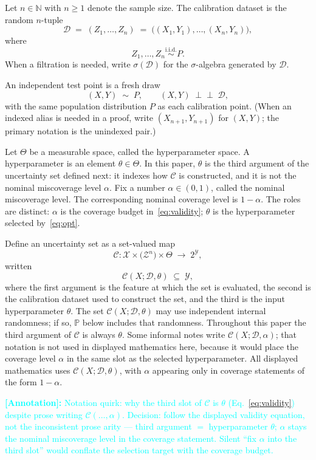 \documentclass[12pt]{article}
\theoremstyle{plain}
\newcommand{\annote}[1]{\textcolor{cyan}{\textbf{[Annotation]:} #1}}
\begin{document}
\label{def:D}
Let $n\in\mathbb{N}$ with $n\ge 1$ denote the sample size.
The calibration dataset is the random $n$-tuple
\[
\mathcal{D}
\;=\;
(Z_1,\dots,Z_n)
\;=\;
\bigl((X_1,Y_1),\dots,(X_n,Y_n)\bigr),
\]
where
\[
Z_1,\dots,Z_n
\overset{\mathrm{i.i.d.}}{\sim}
P.
\]
When a filtration is needed, write $\sigma(\mathcal{D})$ for the $\sigma$-algebra generated by $\mathcal{D}$.

\label{def:test}
An independent test point is a fresh draw
\[
(X,Y)\;\sim\; P,
\qquad
(X,Y)\;\perp\!\!\!\perp\;\mathcal{D},
\]
with the same population distribution $P$ as each calibration point.
(When an indexed alias is needed in a proof, write $(X_{n+1},Y_{n+1})$ for $(X,Y)$; the primary notation is the unindexed pair.)

\label{def:theta}
Let $\Theta$ be a measurable space, called the hyperparameter space.
A hyperparameter is an element $\theta\in\Theta$.
In this paper, $\theta$ is the third argument of the uncertainty set defined next: it indexes how $\mathcal{C}$ is constructed, and it is not the nominal miscoverage level $\alpha$.
\label{def:alpha}
Fix a number $\alpha\in(0,1)$, called the nominal miscoverage level.
The corresponding nominal coverage level is $1-\alpha$.
The roles are distinct: $\alpha$ is the coverage budget in~\eqref{eq:validity}; $\theta$ is the hyperparameter selected by~\eqref{eq:opt}.

\label{def:C}
Define an uncertainty set as a set-valued map
\[
\mathcal{C}
:
\mathcal{X}\times\bigl(\mathcal{Z}^n\bigr)\times\Theta
\;\longrightarrow\;
2^{\mathcal{Y}},
\]
written
\[
\mathcal{C}(X;\mathcal{D},\theta)
\;\subseteq\;
\mathcal{Y},
\]
where the first argument is the feature at which the set is evaluated, the second is the calibration dataset used to construct the set, and the third is the input hyperparameter $\theta$.
The set $\mathcal{C}(X;\mathcal{D},\theta)$ may use independent internal randomness; if so, $\mathbb{P}$ below includes that randomness.
\label{rem:C-arity}
Throughout this paper the third argument of $\mathcal{C}$ is always $\theta$.
Some informal notes write $\mathcal{C}(X;\mathcal{D},\alpha)$; that notation is not used in displayed mathematics here, because it would place the coverage level $\alpha$ in the same slot as the selected hyperparameter.
All displayed mathematics uses $\mathcal{C}(X;\mathcal{D},\theta)$, with $\alpha$ appearing only in coverage statements of the form $1-\alpha$.

\annote{Notation quirk: why the third slot of $\mathcal{C}$ is $\theta$ (Eq.~\eqref{eq:validity}) despite prose writing $\mathcal{C}(\ldots,\alpha)$.
Decision: follow the displayed validity equation, not the inconsistent prose arity --- third argument $=$ hyperparameter $\theta$; $\alpha$ stays the nominal miscoverage level in the coverage statement.
Silent ``fix $\alpha$ into the third slot'' would conflate the selection target with the coverage budget.}
\end{document}

